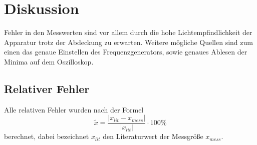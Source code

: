 \section{Diskussion}
Fehler in den Messwerten sind vor allem durch die hohe Lichtempfindlichkeit der Apparatur trotz der Abdeckung zu erwarten. Weitere mögliche Quellen sind zum einen das genaue Einstellen des Frequenzgenerators, sowie genaues Ablesen der Minima auf dem Oszilloskop.
\label{sec:Diskussion}
\subsection{Relativer Fehler}
Alle relativen Fehler wurden nach der Formel
\begin{equation*}
  \tilde{x} = \frac{ \lvert x_{lit} - x_{mess} \rvert}{\lvert x_{lit} \rvert}
  \cdot 100 \%
\end{equation*}
berechnet, dabei bezeichnet $x_{lit}$ den Literaturwert der Messgröße $x_{mess}$.
